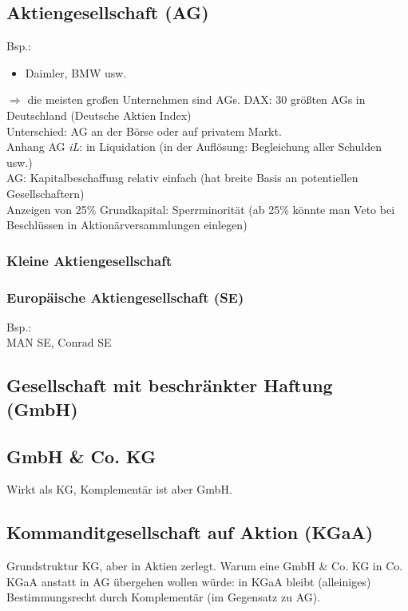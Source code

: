 \documentclass{scrreprt}
\begin{document}
\subsection{Aktiengesellschaft (AG)}
Bsp.:
\begin{itemize}
\item Daimler, BMW usw.
\end{itemize}
$\Rightarrow$ die meisten großen Unternehmen sind AGs.
DAX: 30 größten AGs in Deutschland (Deutsche Aktien Index)\\
Unterschied: AG an der Börse oder auf privatem Markt.\\
Anhang AG \emph{iL}: in Liquidation (in der Auflösung: Begleichung aller Schulden usw.)\\
AG: Kapitalbeschaffung relativ einfach (hat breite Basis an potentiellen Gesellschaftern)\\
Anzeigen von 25\% Grundkapital: Sperrminorität (ab 25\% könnte man Veto bei Beschlüssen in Aktionärversammlungen einlegen)
\subsubsection{Kleine Aktiengesellschaft}
\subsubsection{Europäische Aktiengesellschaft (SE)}
Bsp.:\\
MAN SE, Conrad SE

\subsection{Gesellschaft mit beschränkter Haftung (GmbH)}

\subsection{GmbH \& Co. KG}
Wirkt als KG, Komplementär ist aber GmbH.

\subsection{Kommanditgesellschaft auf Aktion (KGaA)}
Grundstruktur KG, aber in Aktien zerlegt.
Warum eine GmbH \& Co. KG in Co. KGaA anstatt in AG übergehen wollen würde: in KGaA bleibt (alleiniges) Bestimmungsrecht durch Komplementär (im Gegensatz zu AG).
\end{document}

